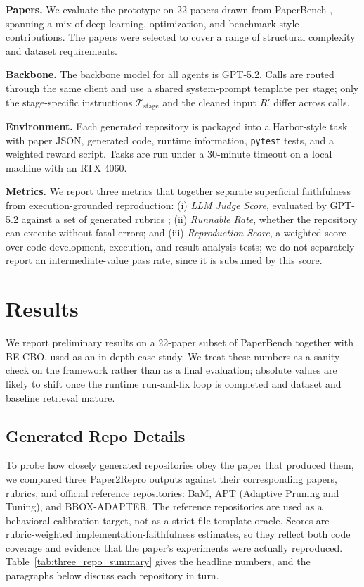 \documentclass[11pt]{article}
\begin{document}
\textbf{Papers.} We evaluate the prototype on 22 papers drawn from PaperBench \citep{starace2025paperbench}, spanning a mix of deep-learning, optimization, and benchmark-style contributions. The papers were selected to cover a range of structural complexity and dataset requirements.

\textbf{Backbone.} The backbone model for all agents is GPT-5.2. Calls are routed through the same client and use a shared system-prompt template per stage; only the stage-specific instructions $\mathcal{T}_{\text{stage}}$ and the cleaned input $R'$ differ across calls.

\textbf{Environment.} Each generated repository is packaged into a Harbor-style task with paper JSON, generated code, runtime information, \texttt{pytest} tests, and a weighted reward script. Tasks are run under a 30-minute timeout on a local machine with an RTX 4060.

\textbf{Metrics.} We report three metrics that together separate
superficial faithfulness from execution-grounded reproduction:
(i) \emph{LLM Judge Score}, evaluated by GPT-5.2 against a set of
generated rubrics ;
(ii) \emph{Runnable Rate}, whether the repository can execute without
fatal errors; and
(iii) \emph{Reproduction Score}, a weighted score over code-development,
execution, and result-analysis tests; we do not separately report an
intermediate-value pass rate, since it is subsumed by this score.

\section{Results}

We report preliminary results on a 22-paper subset of PaperBench
together with BE-CBO, used as an in-depth case study. We treat
these numbers as a sanity check on the framework rather than as
a final evaluation; absolute values are likely to shift once the
runtime run-and-fix loop is completed and dataset and baseline
retrieval mature.
\subsection{Generated Repo Details}

To probe how closely generated repositories obey the paper that
produced them, we compared three Paper2Repro outputs against their
corresponding papers, rubrics, and official reference repositories:
BaM, APT (Adaptive Pruning and Tuning), and BBOX-ADAPTER. The
reference repositories are used as a behavioral calibration target,
not as a strict file-template oracle. Scores are rubric-weighted
implementation-faithfulness estimates, so they reflect both code
coverage and evidence that the paper's experiments were actually
reproduced. Table~\ref{tab:three_repo_summary} gives the headline
numbers, and the paragraphs below discuss each repository in turn.
\end{document}
